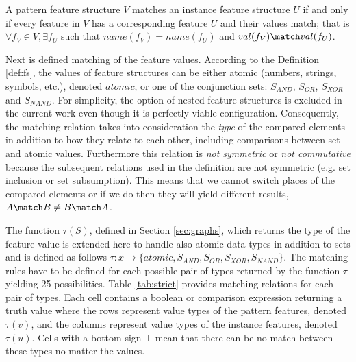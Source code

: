 \begin{definition}\label{def:fs-match}
    A pattern feature structure $V$ matches an instance feature structure $U$ if and only if every feature in $V$ has a corresponding feature $U$ and their values match; that is $ \forall f_V \in V, \exists f_U$ such that $name(f_V) = name(f_U)$ and $ val(f_V) \match val(f_U)$.
\end{definition}

Next is defined matching of the feature values. According to the Definition \ref{def:fs}, the values of feature structures can be either atomic (numbers, strings, symbols, etc.), denoted $atomic$, or one of the conjunction sets: $S_{AND}$, $S_{OR}$, $S_{XOR}$ and $S_{NAND}$. For simplicity, the option of nested feature structures is excluded in the current work even though it is perfectly viable configuration. Consequently, the matching relation takes into consideration the \textit{type} of the compared elements in addition to how they relate to each other, including comparisons between set and atomic values. 
Furthermore this relation is \textit{not symmetric} or \textit{not commutative} because the subsequent relations used in the definition are not symmetric (e.g. set inclusion or set subsumption). 
This means that we cannot switch places of the compared elements or if we do then they will yield different results, $A \match B \neq B \match A $. 

The function $\tau(S)$, defined in Section \ref{sec:graphs}, which returns the type of the feature value is extended here to handle also atomic data types in addition to sets and is defined as follows $\tau:x \rightarrow \{atomic, S_{AND}, S_{OR}, S_{XOR}, S_{NAND} \}$. The matching rules have to be defined for each possible pair of types returned by the function $\tau$ yielding 25 possibilities. Table \ref{tab:strict} provides matching relations for each pair of types. Each cell contains a boolean or comparison expression returning a truth value where the rows represent value types of the pattern features, denoted $\tau(v)$, and the columns represent value types of the instance features, denoted $\tau(u)$. Cells with a bottom sign $\bot$ mean that there can be no match between these types no matter the values. 

